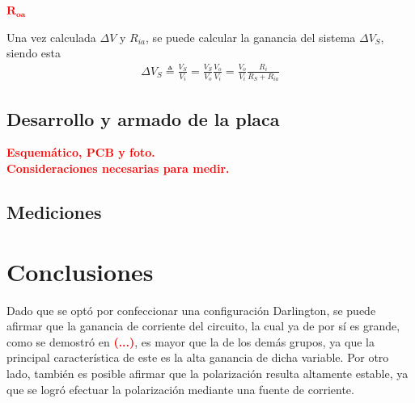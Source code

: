 \begin{center}
	\LARGE{\textcolor{red}{$\mathbf{R_{oa}}$}}
\end{center}

Una vez calculada $\Delta V$ y $R_{ia}$, se puede calcular la ganancia del sistema $\Delta V_S$, siendo esta
\begin{equation}
\begin{split}
	\Delta V_S \triangleq \frac{V_S}{V_i} = \frac{V_S}{V_o} \frac{V_o}{V_i} = \frac{V_o}{V_i} \frac{R_i}{R_S + R_{ia}}
\end{split}
\label{equ:vs}
\end{equation}

\subsection{Desarrollo y armado de la placa}
\begin{center}
	\LARGE{\textcolor{red}{\textbf{Esquemático, PCB y foto.}}}\\
	\LARGE{\textcolor{red}{\textbf{Consideraciones necesarias para medir.}}}
\end{center}

\subsection{Mediciones}

\section{Conclusiones}
Dado que se optó por confeccionar una configuración Darlington, se puede afirmar que la ganancia de corriente del circuito, la cual ya de por sí es grande, como se demostró en \textcolor{red}{\textbf{(...)}}, es mayor que la de los demás grupos, ya que la principal característica de este es la alta ganancia de dicha variable. Por otro lado, también es posible afirmar que la polarización resulta altamente estable, ya que se logró efectuar la polarización mediante una fuente de corriente.
	
